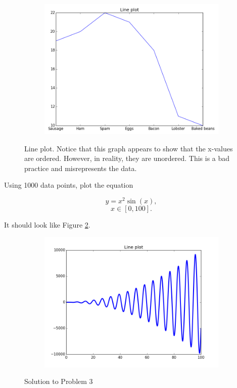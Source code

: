 \begin{figure}
\centering
\begin{subfigure}{.5\textwidth}
\centering
\includegraphics[width=\textwidth]{line_plot_bad_X.png}
\end{subfigure}
\caption{Line plot.  Notice that this graph appears to show that the x-values are ordered.  However, in reality, they are unordered.  This is a bad practice and misrepresents the data.}
\label{fig:lineplotbadX}
\end{figure}


\begin{problem}
Using 1000 data points, plot the equation

$$y = x^2\sin(x),$$
$$x \in [0,100].$$


It should look like Figure \ref{fig:lineplot}.
\end{problem}

\begin{figure}
\centering
\begin{subfigure}{.5\textwidth}
\centering
\includegraphics[width=\textwidth]{line_plot.png}
\end{subfigure}
\caption{Solution to Problem 3}
\label{fig:lineplot}
\end{figure}


